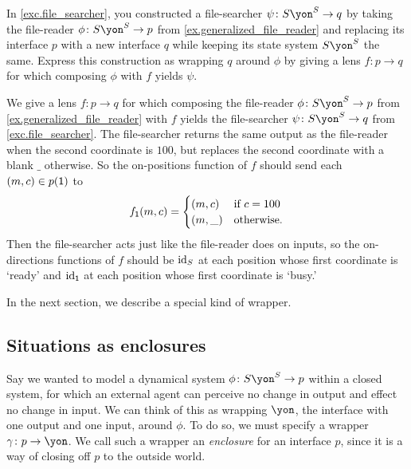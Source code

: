 \documentclass[Book-Poly]{subfiles}
\begin{document}
\begin{exercise} \label{exc.file_searcher_wrap}
In \cref{exc.file_searcher}, you constructed a file-searcher $\psi\colon S\yon^S\to q$ by taking the file-reader $\phi\colon S\yon^S\to p$ from \cref{ex.generalized_file_reader} and replacing its interface $p$ with a new interface $q$ while keeping its state system $S\yon^S$ the same.
Express this construction as wrapping $q$ around $\phi$ by giving a lens $f\colon p\to q$ for which composing $\phi$ with $f$ yields $\psi$.
\begin{solution}
We give a lens $f\colon p\to q$ for which composing the file-reader $\phi\colon S\yon^S\to p$ from \cref{ex.generalized_file_reader} with $f$ yields the file-searcher $\psi\colon S\yon^S\to q$ from \cref{exc.file_searcher}.
The file-searcher returns the same output as the file-reader when the second coordinate is $100$, but replaces the second coordinate with a blank $\_$ otherwise.
So the on-positions function of $f$ should send each $(m,c)\in p(\textsf{1})$ to
\[
    f_{\textsf{1}}(m,c) = 
        \begin{cases}
            (m,c) & \text{if } c = 100 \\
            (m,\_) & \text{otherwise}.
        \end{cases}
\]
Then the file-searcher acts just like the file-reader does on inputs, so the on-directions functions of $f$ should be $\mathrm{id}_S$ at each position whose first coordinate is `ready' and $\mathrm{id}_{\textsf{1}}$ at each position whose first coordinate is `busy.'
\end{solution}
\end{exercise}

In the next section, we describe a special kind of wrapper.

\subsection{Situations as enclosures}\label{subsec.poly.dyn_sys.new.sit_encl}
Say we wanted to model a dynamical system $\phi\colon S\yon^S\to p$ within a closed system, for which an external agent can perceive no change in output and effect no change in input.
We can think of this as wrapping $\yon$, the interface with one output and one input, around $\phi$.
To do so, we must specify a wrapper $\gamma\colon p\to\yon$.
We call such a wrapper an \emph{enclosure} for an interface $p$, since it is a way of closing off $p$ to the outside world.
\end{document}

